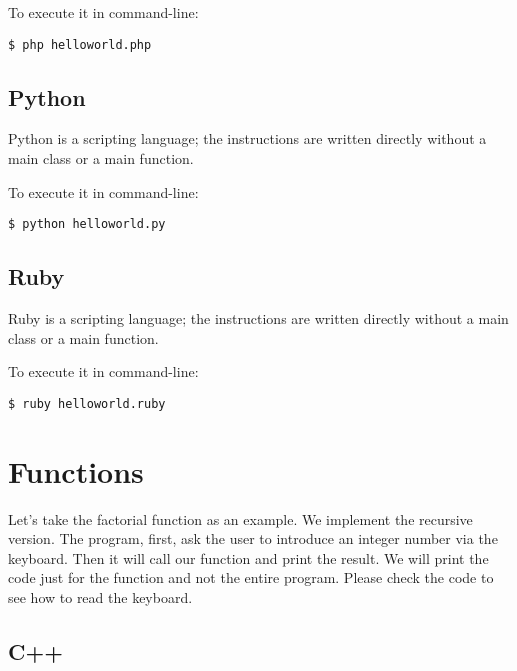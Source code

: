 \documentclass{KodeBook}
\begin{document}


To execute it in command-line:
\begin{lstlisting}[style=shellStyle]
$ php helloworld.php
\end{lstlisting}

\subsection{Python}

Python is a scripting language; the instructions are written directly without a main class or a main function.



To execute it in command-line:
\begin{lstlisting}[style=shellStyle]
$ python helloworld.py
\end{lstlisting}

\subsection{Ruby}

Ruby is a scripting language; the instructions are written directly without a main class or a main function.



To execute it in command-line:
\begin{lstlisting}[style=shellStyle]
$ ruby helloworld.ruby
\end{lstlisting}

\section{Functions}

Let's take the factorial function as an example. 
We implement the recursive version.  
The program, first, ask the user to introduce an integer number via the keyboard. 
Then it will call our function and print the result. 
We will print the code just for the function and not the entire program.
Please check the code to see how to read the keyboard.

\subsection{C++}
\end{document}
